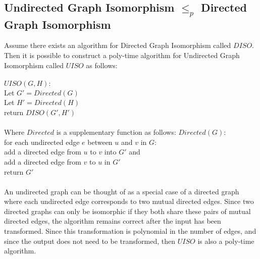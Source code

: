 \documentclass[letterpaper,notitlepage,twoside]{article}
\newcommand\tab[1][1cm]{\hspace*{#1}} %
\begin{document}
\subsection*{Undirected Graph Isomorphism $\leq_p$ Directed Graph Isomorphism}
Assume there exists an algorithm for Directed Graph Isomorphism called $DISO$. Then it is possible to construct a poly-time algorithm for Undirected Graph Isomorphism called $UISO$ as follows:
\\\\
$UISO(G, H):$\\
\tab Let $G' = Directed(G)$\\
\tab Let $H' = Directed(H)$\\
\tab return $DISO(G', H')$
\\\\
Where $Directed$ is a supplementary function as follows:
$Directed(G):$\\
\tab for each undirected edge $e$ between $u$ and $v$ in $G$:\\
\tab\tab add a directed edge from $u$ to $v$ into $G'$ and\\
\tab\tab add a directed edge from $v$ to $u$ in $G'$\\
\tab return $G'$
\\\\
An undirected graph can be thought of as a special case of a directed graph where each undirected edge corresponds to two mutual directed edges. Since two directed graphs can only be isomorphic if they both share these pairs of mutual directed edges, the algorithm remains correct after the input has been transformed. Since this transformation is polynomial in the number of edges, and since the output does not need to be transformed, then $UISO$ is also a poly-time algorithm.
\end{document}
